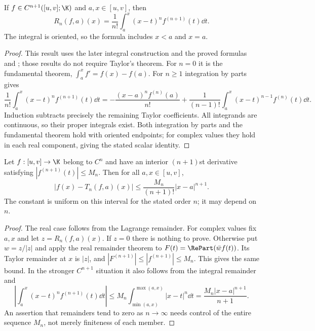\begin{theorem}
If $f\in C^{n+1}([u,v];\K)$ and $a,x\in[u,v]$, then
\[ R_n(f,a)(x)=\frac1{n!}\int_a^x(x-t)^n f^{(n+1)}(t)\dd t. \]
The integral is oriented, so the formula includes $x<a$ and $x=a$.
\end{theorem}
\begin{proof}
This result uses the later integral construction and the proved formulas  and ; those results do not require Taylor's theorem. For $n=0$ it is the fundamental theorem, $\int_a^x f'=f(x)-f(a)$. For $n\ge1$ integration by parts gives
\[ \frac1{n!}\int_a^x(x-t)^n f^{(n+1)}(t)\dd t
=-\frac{(x-a)^n f^{(n)}(a)}{n!}+\frac1{(n-1)!}\int_a^x(x-t)^{n-1}f^{(n)}(t)\dd t. \]
Induction subtracts precisely the remaining Taylor coefficients. All integrands are continuous, so their proper integrals exist. Both integration by parts and the fundamental theorem hold with oriented endpoints; for complex values they hold in each real component, giving the stated scalar identity.
\end{proof}

\begin{theorem}
Let $f:[u,v]\to\K$ belong to $C^n$ and have an interior $(n+1)$st derivative satisfying $|f^{(n+1)}(t)|\le M_n$. Then for all $a,x\in[u,v]$,
\[ |f(x)-T_n(f,a)(x)|\le\frac{M_n}{(n+1)!}|x-a|^{n+1}. \]
The constant is uniform on this interval for the stated order $n$; it may depend on $n$.
\end{theorem}
\begin{proof}
The real case follows from the Lagrange remainder. For complex values fix $a,x$ and let $z=R_n(f,a)(x)$. If $z=0$ there is nothing to prove. Otherwise put $w=z/|z|$ and apply the real remainder theorem to $F(t)=\RePart(\bar w f(t))$. Its Taylor remainder at $x$ is $|z|$, and $|F^{(n+1)}|\le|f^{(n+1)}|\le M_n$. This gives the same bound. In the stronger $C^{n+1}$ situation it also follows from the integral remainder and
\[ \left|\int_a^x(x-t)^n f^{(n+1)}(t)\dd t\right|\le M_n\int_{\min(a,x)}^{\max(a,x)}|x-t|^n\dd t=\frac{M_n|x-a|^{n+1}}{n+1}. \]
An assertion that remainders tend to zero as $n\to\infty$ needs control of the entire sequence $M_n$, not merely finiteness of each member.
\end{proof}

